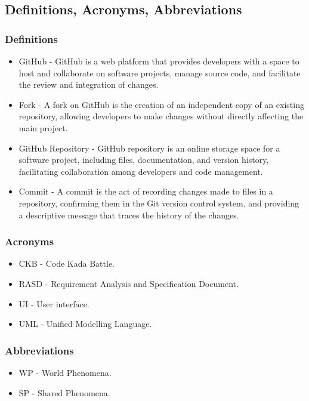 \subsection{Definitions, Acronyms, Abbreviations}

\subsubsection{Definitions}
\begin{itemize}
    \item GitHub - GitHub is a web platform that provides developers with a space to host and collaborate on software projects, manage source code, and facilitate the review and integration of changes.
    \item Fork - A fork on GitHub is the creation of an independent copy of an existing repository, allowing developers to make changes without directly affecting the main project.
    \item GitHub Repository - GitHub repository is an online storage space for a software project, including files, documentation, and version history, facilitating collaboration among developers and code management.
    \item Commit - A commit is the act of recording changes made to files in a repository, confirming them in the Git version control system, and providing a descriptive message that traces the history of the changes.
\end{itemize}
\subsubsection{Acronyms}
\begin{itemize}
    \item CKB - Code Kada Battle.
    \item RASD - Requirement Analysis and Specification Document. 
    \item UI - User interface. 
    \item UML - Unified Modelling Language.
\end{itemize}
\subsubsection{Abbreviations}
\begin{itemize}
    \item WP - World Phenomena.
    \item SP - Shared Phenomena.
\end{itemize}


